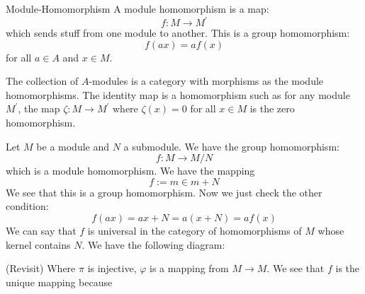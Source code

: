 \documentclass{report}
\begin{document}
\begin{definition}{Module-Homomorphism}
    A module homomorphism is a map:
        \begin{equation*}
            f : M \rightarrow M^{\prime}
        \end{equation*}
    which sends stuff from one module to another. This is a group homomorphism:
        \begin{equation*}
            f(ax) = af(x)
        \end{equation*}
    for all $a \in A$ and $x \in M$.
\end{definition}

The collection of $A$-modules is a category with morphisms as the module homomorphisms. The identity map is a homomorphism such as for any module $M^{\prime}$, the map $\zeta : M \rightarrow M^{\prime}$ where $\zeta(x) = 0$ for all $x \in M$ is the zero homomorphism.

Let $M$ be a module and $N$ a submodule. We have the group homomorphism:
    \begin{equation*}
        f: M \rightarrow M/N
    \end{equation*}
which is a module homomorphism. We have the mapping
    \begin{equation*}
        f:= m \in m + N
    \end{equation*}
We see that this is a group homomorphism. Now we just check the other condition:
    \begin{equation*}
        f(ax) = ax + N = a(x + N) = af(x)
    \end{equation*}
We can say that $f$ is universal in the category of homomorphisms of $M$ whose kernel contains $N$. We have the following diagram:
    \begin{center}
    \end{center}
(Revisit) Where $\pi$ is injective, $\varphi$ is a mapping from $M \rightarrow M$. We see that $f$ is the unique mapping because 
\end{document}

